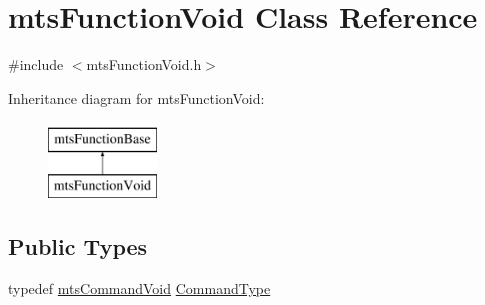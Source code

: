 \hypertarget{classmts_function_void}{}\section{mts\+Function\+Void Class Reference}
\label{classmts_function_void}


{\ttfamily \#include $<$mts\+Function\+Void.\+h$>$}

Inheritance diagram for mts\+Function\+Void\+:\begin{figure}[H]
\begin{center}
\leavevmode
\includegraphics[height=2.000000cm]{da/d2b/classmts_function_void}
\end{center}
\end{figure}
\subsection*{Public Types}
\begin{DoxyCompactItemize}
\item 
typedef \hyperlink{classmts_command_void}{mts\+Command\+Void} \hyperlink{classmts_function_void_a76cc1c4742429e7cac7e4b73412f4cc9}{Command\+Type}
\end{DoxyCompactItemize}
